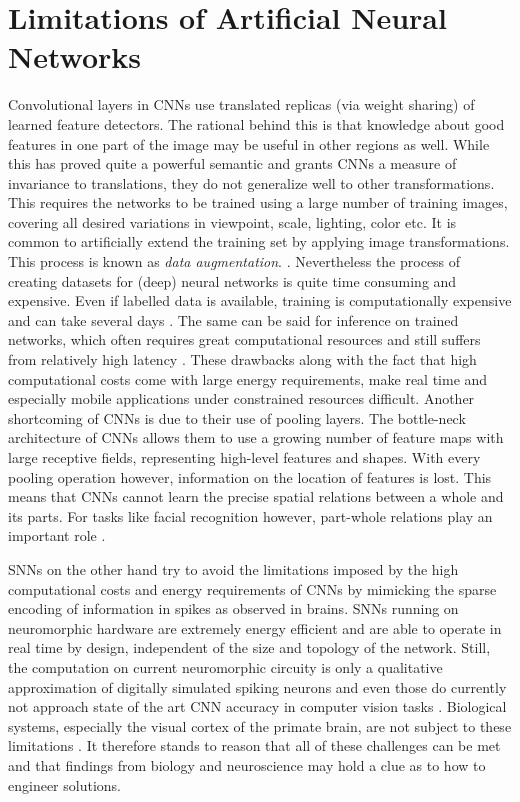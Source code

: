 \section{Limitations of Artificial Neural Networks}\label{section:limitations}
Convolutional layers in CNNs use translated replicas (via weight sharing) of learned feature detectors. The rational behind this is that knowledge about good features in one part of the image may be useful in other regions as well. While this has proved quite a powerful semantic and grants CNNs a measure of invariance to translations, they do not generalize well to other transformations. This requires the networks to be trained using a large number of training images, covering all desired variations in viewpoint, scale, lighting, color etc. It is common to artificially extend the training set by applying image transformations. This process is known as \emph{data augmentation}.  \cite{wong2016understanding,perez2017effectiveness}. Nevertheless the process of creating datasets for (deep) neural networks is quite time consuming and expensive. Even if labelled data is available, training is computationally expensive and can take several days \cite{Lee:2016:HVC:3012029.3012067,silver2016mastering}. The same can be said for inference on trained networks, which often requires great computational resources and still suffers from relatively high latency \cite{dong2009high}. These drawbacks along with the fact that high computational costs come with large energy requirements, make real time and especially mobile applications under constrained resources difficult. Another shortcoming of CNNs is due to their use of pooling layers. The bottle-neck architecture of CNNs allows them to use a growing number of feature maps with large receptive fields, representing high-level features and shapes. With every pooling operation however, information on the location of features is lost. This means that CNNs cannot learn the precise spatial relations between a whole and its parts. For tasks like facial recognition however, part-whole relations play an important role \cite{tanaka2016parts}. 

SNNs on the other hand try to avoid the limitations imposed by the high computational costs and energy requirements of CNNs by mimicking the sparse encoding of information in spikes as observed in brains. SNNs running on neuromorphic hardware are extremely energy efficient and are able to operate in real time by design, independent of the size and topology of the network. Still, the computation on current neuromorphic circuity is only a qualitative approximation of digitally simulated spiking neurons and even those do currently not approach state of the art CNN accuracy in computer vision tasks \cite{indiveri2011neuromorphic,diehl2015unsupervised}. Biological systems, especially the visual cortex of the primate brain, are not subject to these limitations \cite{stone2018rotation,isbister2018new}. It therefore stands to reason that all of these challenges can be met and that findings from biology and neuroscience may hold a clue as to how to engineer solutions.

